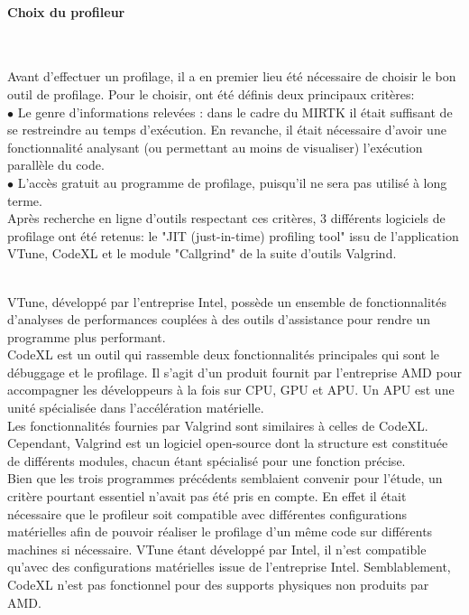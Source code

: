 \documentclass[10pt]{report}
\begin{document}
			\paragraph{Choix du profileur}~\par

Avant d'effectuer un profilage, il a en premier lieu été nécessaire de choisir le bon outil de profilage. Pour le choisir, ont été définis deux principaux critères:\\
{$\bullet$} Le genre d'informations relevées : dans le cadre du MIRTK il était suffisant de se restreindre au temps d'exécution. En revanche, il était nécessaire d'avoir une fonctionnalité analysant (ou permettant au moins de visualiser) l'exécution parallèle du code. \\
{$\bullet$} L'accès gratuit au programme de profilage, puisqu'il ne sera pas utilisé à long terme.\\
Après recherche en ligne d'outils respectant ces critères, 3 différents logiciels de profilage ont été retenus: le "JIT (just-in-time) profiling tool" issu de l'application VTune, CodeXL et le module "Callgrind" de la suite d'outils Valgrind.\\~\par
\noindent VTune, développé par l'entreprise Intel, possède un ensemble de fonctionnalités d'analyses de performances couplées à des outils d'assistance pour rendre un programme plus performant. \\
CodeXL est un outil qui rassemble deux fonctionnalités principales qui sont le débuggage et le profilage. Il s'agit d'un produit fournit par l'entreprise AMD pour accompagner les développeurs à la fois sur CPU, GPU et APU. Un APU est une unité spécialisée dans l'accélération matérielle.
\\Les fonctionnalités fournies par Valgrind sont similaires à celles de CodeXL. Cependant, Valgrind est un logiciel open-source dont la structure est constituée de différents modules, chacun étant spécialisé pour une fonction précise.\\

Bien que les trois programmes précédents semblaient convenir pour l'étude, un critère pourtant essentiel n'avait pas été pris en compte. En effet il était nécessaire que le profileur soit compatible avec différentes configurations matérielles afin de pouvoir réaliser le profilage d'un même code sur différents machines si nécessaire. VTune étant développé par Intel, il n'est compatible qu'avec des configurations matérielles issue de l'entreprise Intel. Semblablement, CodeXL n'est pas fonctionnel pour des supports physiques non produits par AMD.\\
\end{document}
